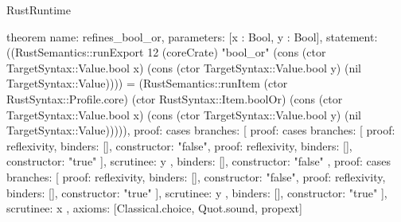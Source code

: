 \begin{lexlean}{RustRuntime}
\begin{semanticmodule}
theorem{
  name: refines_bool_or,
  parameters: [x : Bool, y : Bool],
  statement: ((RustSemantics::runExport 12 (coreCrate) "bool_or" (cons (ctor TargetSyntax::Value.bool x) (cons (ctor TargetSyntax::Value.bool y) (nil TargetSyntax::Value)))) = (RustSemantics::runItem (ctor RustSyntax::Profile.core) (ctor RustSyntax::Item.boolOr) (cons (ctor TargetSyntax::Value.bool x) (cons (ctor TargetSyntax::Value.bool y) (nil TargetSyntax::Value))))),
  proof: cases{
    branches: [
      {
        proof: cases{
          branches: [
            {proof: reflexivity{}, binders: [], constructor: "false"},
            {proof: reflexivity{}, binders: [], constructor: "true"}
          ],
          scrutinee: y
        },
        binders: [],
        constructor: "false"
      },
      {
        proof: cases{
          branches: [
            {proof: reflexivity{}, binders: [], constructor: "false"},
            {proof: reflexivity{}, binders: [], constructor: "true"}
          ],
          scrutinee: y
        },
        binders: [],
        constructor: "true"
      }
    ],
    scrutinee: x
  },
  axioms: [Classical.choice, Quot.sound, propext]
}


\end{semanticmodule}
\end{lexlean}
